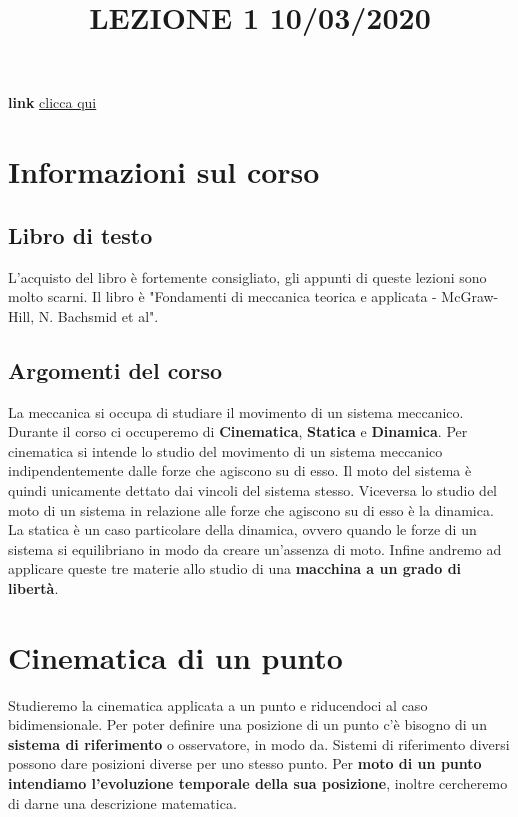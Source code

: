 \title{LEZIONE 1 10/03/2020}\newline
\textbf{link} \href{https://web.microsoftstream.com/video/58e86b29-c2c0-47d6-bbb4-f54861155460}{clicca qui}
\section{Informazioni sul corso}
\subsection{Libro di testo}
L'acquisto del libro è fortemente consigliato, gli appunti di queste lezioni sono molto scarni. Il libro è "Fondamenti di meccanica teorica e applicata - McGraw-Hill, N. Bachsmid et al".
\subsection{Argomenti del corso}
La meccanica si occupa di studiare il movimento di un sistema meccanico. Durante il corso ci occuperemo di \textbf{Cinematica}, \textbf{Statica} e \textbf{Dinamica}.\newline
Per cinematica si intende lo studio del movimento di un sistema meccanico indipendentemente dalle forze che agiscono su di esso. Il moto del sistema è quindi unicamente dettato dai vincoli del sistema stesso.\newline
Viceversa lo studio del moto di un sistema in relazione alle forze che agiscono su di esso è la dinamica.\newline
La statica è un caso particolare della dinamica, ovvero quando le forze di un sistema si equilibriano in modo da creare un'assenza di moto.\newline
Infine andremo ad applicare queste tre materie allo studio di una \textbf{macchina a un grado di libertà}.
\section{Cinematica di un punto}
Studieremo la cinematica applicata a un punto e riducendoci al caso bidimensionale.\newline
Per poter definire una posizione di un punto c'è bisogno di un \textbf{sistema di riferimento} o osservatore, in modo da. Sistemi di riferimento diversi possono dare posizioni diverse per uno stesso punto.\newline
Per \textbf{moto di un punto intendiamo l'evoluzione temporale della sua posizione}, inoltre cercheremo di darne una descrizione matematica.
